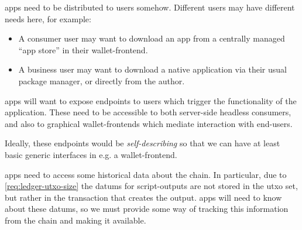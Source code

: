 \documentclass[plutus.tex]{subfiles}
\begin{document}
\begin{requirement}[Distribution]
\label{req:app-dist}
\Glspl{app} need to be distributed to users somehow.
Different users may have different needs here, for example:
\begin{itemize}
\item A consumer user may want to download an \gls{app} from a centrally managed ``app store'' in their \gls{wallet-frontend}.
\item A business user may want to download a native application via their usual package manager, or directly from the author.
\end{itemize}
\end{requirement}

\begin{requirement}
\label{req:app-client-interfaces}
\Glspl{app} will want to expose endpoints to users which trigger the functionality of the application.
These need to be accessible to both server-side headless consumers, and also to graphical \glspl{wallet-frontend} which mediate interaction with end-users.

Ideally, these endpoints would be \emph{self-describing} so that we can have at least basic generic interfaces in e.g. a \gls{wallet-frontend}.
\end{requirement}

\begin{requirement}
\label{req:app-chain-data}
\Glspl{app} need to access some historical data about the chain.
In particular, due to \cref{req:ledger-utxo-size} the \glspl{datum} for \glspl{script-output} are not stored in the \gls{utxo} set, but rather in the transaction that creates the output.
\Glspl{app} will need to know about these \glspl{datum}, so we must provide some way of tracking this information from the chain and making it available.

\end{requirement}
\end{document}
